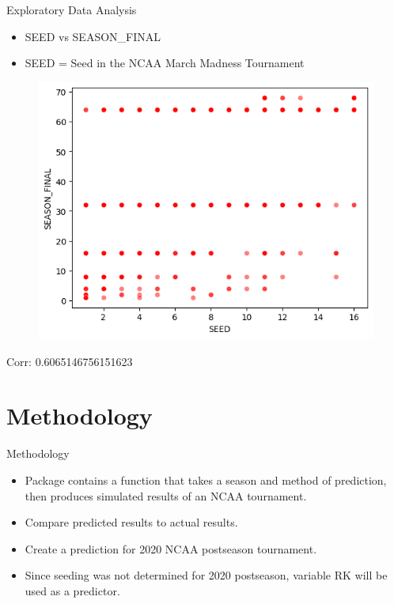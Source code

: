 \documentclass{beamer}
\begin{document}
\begin{frame}{Exploratory Data Analysis}
  \begin{center}
    \begin{itemize}
        \item SEED vs SEASON\_FINAL
        \item SEED = Seed in the NCAA March Madness Tournament
    \end{itemize}

    \begin{figure}
      \centering
      \includegraphics[width=0.5\linewidth]{seedscatterplot.png} %
    \end{figure}

    \vspace{0.1cm}

    Corr: 0.6065146756151623
  \end{center}
\end{frame}

\section{Methodology}

\begin{frame}{Methodology}
\begin{itemize}
  \item Package contains a function that takes a season and method of prediction, then produces simulated results of an NCAA tournament.
  \item Compare predicted results to actual results.
  \item Create a prediction for 2020 NCAA postseason tournament.
  \item Since seeding was not determined for 2020 postseason, variable RK will be used as a predictor.
\end{itemize}
\end{frame}
\end{document}
